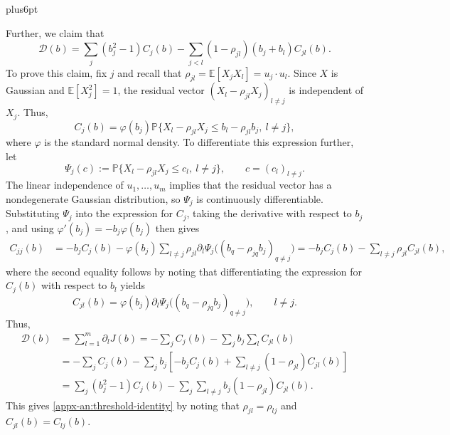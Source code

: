 \documentclass[11pt,letterpaper,twoside,leqno]{article}
\makeatletter
\theoremstyle{bookplain}
\theoremstyle{bookremark}
\renewenvironment{proof}[1][\proofname]{\par
  \pushQED{\qed}\normalfont\topsep6pt plus6pt\relax
  \trivlist\item[\hskip\labelsep\bfseries #1\@addpunct{.}]\ignorespaces
}{\popQED\endtrivlist\@endpefalse}
\newcommand{\E}{\mathbb E}
\newcommand{\Pp}{\mathbb P}
\makeatother
\begin{document}
\begin{proof}
Further, we claim that
\begin{equation}
 \mathcal D(b)=\sum_j(b_j^2-1)C_j(b)
   -\sum_{j<l}(1-\rho_{jl})(b_j+b_l)C_{jl}(b).
 \label{appx-an:threshold-identity}
\end{equation}
To prove this claim,
fix \(j\) and recall that \(\rho_{jl}=\E[X_jX_l]=u_j\cdot u_l\).
Since \(X\) is Gaussian and \(\E[X_j^2]=1\), the residual
vector \((X_l-\rho_{jl}X_j)_{l\ne j}\) is independent of \(X_j\).
Thus,
\begin{equation}\label{appx-an:conditional-first-derivative}
C_j(b)
=\varphi(b_j)\Pp\{X_l-\rho_{jl}X_j \le b_l-\rho_{jl}b_j,\ l\ne j\},
\end{equation}
where \(\varphi\) is the standard normal density. To differentiate this expression further, let
\[
\Psi_j(c):=\Pp\{X_l-\rho_{jl}X_j\le c_l,\ l\ne j\},
\qquad c=(c_l)_{l\ne j}.
\]
The linear independence of \(u_1,\ldots,u_m\) implies that
the residual vector has a nondegenerate Gaussian distribution,
so \(\Psi_j\) is continuously differentiable. Substituting $\Psi_j$ into the expression for $C_j$, taking the derivative with respect to $b_j$, and using \(\varphi'(b_j)=-b_j\varphi(b_j)\) then gives
\begin{align*}
C_{jj}(b)
&=-b_jC_j(b)
 -\varphi(b_j)\sum_{l\ne j}\rho_{jl}
 \partial_l\Psi_j\big((b_q-\rho_{jq}b_j)_{q\ne j}\big)=-b_jC_j(b)-\sum_{l\ne j}\rho_{jl}C_{jl}(b),
\end{align*}
where the second equality follows by noting that differentiating the
expression for \(C_j(b)\) with respect to \(b_l\) yields
\[
C_{jl}(b)
=\varphi(b_j)
\partial_l\Psi_j\big((b_q-\rho_{jq}b_j)_{q\ne j}\big),
\qquad l\ne j.
\]
Thus,
\[
\begin{aligned}
\mathcal D(b)
&=\sum_{l=1}^m\partial_lJ(b)=-\sum_j C_j(b)
  -\sum_j b_j\sum_l C_{jl}(b)\\
&=-\sum_j C_j(b)
  -\sum_j b_j\left[
      -b_jC_j(b)
      +\sum_{l\ne j}(1-\rho_{jl})C_{jl}(b)
    \right]\\
&=\sum_j(b_j^2-1)C_j(b)
  -\sum_j\sum_{l\ne j}
       b_j(1-\rho_{jl})C_{jl}(b).
\end{aligned}
\]
This gives \eqref{appx-an:threshold-identity} by noting that \(\rho_{jl}=\rho_{lj}\) and \(C_{jl}(b)=C_{lj}(b)\).



\end{proof}
\end{document}
